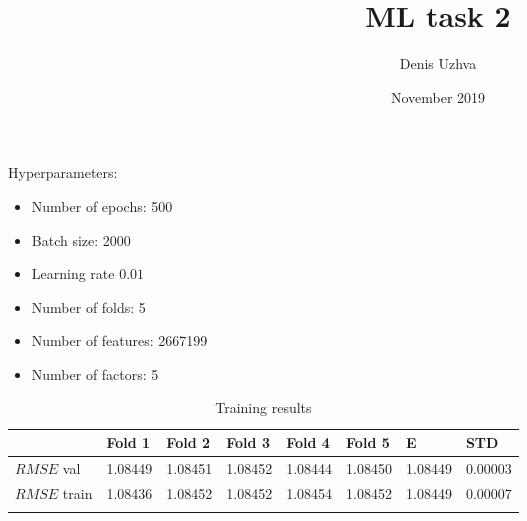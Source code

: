 \documentclass{article}
\begin{document}
\title{ML task 2}
\author{Denis Uzhva}
\date{November 2019}
\maketitle

Hyperparameters:
\begin{itemize}
    	\item Number of epochs: 500
    	\item Batch size: 2000
    	\item Learning rate $0.01$
    	\item Number of folds: 5
    	\item Number of features: 2667199
	\item Number of factors: 5
\end{itemize}

\begin{longtable}{llllllll}
    	\toprule
    		&	Fold 1  &   Fold 2 & Fold 3  & Fold 4 & Fold 5   & E & STD   \\
    	\midrule
    	    	$RMSE$ val	&	1.08449	&	1.08451	&	1.08452	&	1.08444	&	1.08450	&	1.08449	&	0.00003	\\
    	    	$RMSE$ train	&	1.08436	&	1.08452	&	1.08452	&	1.08454	&	1.08452	&	1.08449	&	0.00007	\\
    	\bottomrule
    	\caption{Training results}
	\label{tab:acc}
\end{longtable}
\end{document}
